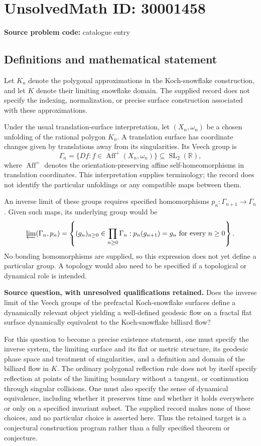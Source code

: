 \documentclass[11pt]{article}
\newcommand{\R}{\mathbb{R}}
\begin{document}
\section*{UnsolvedMath ID: 30001458}
\textbf{Source problem code:} catalogue entry
\subsection{Definitions and mathematical statement}
Let \(K_n\) denote the polygonal approximations in the Koch-snowflake construction, and let \(K\) denote their limiting snowflake domain. The supplied record does not specify the indexing, normalization, or precise surface construction associated with these approximations.

Under the usual translation-surface interpretation, let \((X_n,\omega_n)\) be a chosen unfolding of the rational polygon \(K_n\). A translation surface has coordinate changes given by translations away from its singularities. Its Veech group is
\[
\Gamma_n=\{D f: f\in\operatorname{Aff}^{+}(X_n,\omega_n)\}\subseteq\operatorname{SL}_2(\R),
\]
where \(\operatorname{Aff}^{+}\) denotes the orientation-preserving affine self-homeomorphisms in translation coordinates. This interpretation supplies terminology; the record does not identify the particular unfoldings or any compatible maps between them.

An inverse limit of these groups requires specified homomorphisms \(p_n:\Gamma_{n+1}\to\Gamma_n\). Given such maps, its underlying group would be
\[
\varprojlim(\Gamma_n,p_n)
=\left\{(g_n)_{n\geq 0}\in\prod_{n\geq 0}\Gamma_n:
 p_n(g_{n+1})=g_n\text{ for every }n\geq 0\right\}.
\]
No bonding homomorphisms are supplied, so this expression does not yet define a particular group. A topology would also need to be specified if a topological or dynamical role is intended.

\textbf{Source question, with unresolved qualifications retained.} Does the inverse limit of the Veech groups of the prefractal Koch-snowflake surfaces define a dynamically relevant object yielding a well-defined geodesic flow on a fractal flat surface dynamically equivalent to the Koch-snowflake billiard flow?

For this question to become a precise existence statement, one must specify the inverse system, the limiting surface and its flat or metric structure, its geodesic phase space and treatment of singularities, and a definition and domain of the billiard flow in \(K\). The ordinary polygonal reflection rule does not by itself specify reflection at points of the limiting boundary without a tangent, or continuation through singular collisions. One must also specify the sense of dynamical equivalence, including whether it preserves time and whether it holds everywhere or only on a specified invariant subset. The supplied record makes none of these choices, and no particular choice is asserted here. Thus the retained target is a conjectural construction program rather than a fully specified theorem or conjecture.
\end{document}
